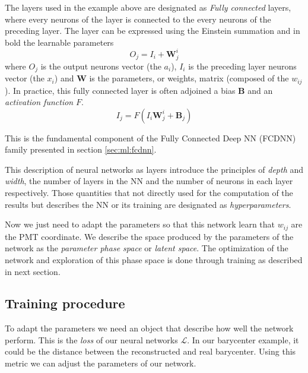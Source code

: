 \documentclass[../main.tex]{subfiles}
\begin{document}
The layers used in the example above are designated as \textit{Fully connected} layers, where every neurons of the layer is connected to the every neurons of the preceding layer. The layer can be expressed using the Einstein summation and in bold the learnable parameters
\begin{equation}
  \label{eq:ml:fully-connected-simple}
  O_{j} = I_{i} + \bm{W}_{j}^{i}
\end{equation}
where $O_{j}$ is the output neurons vector (the $a_i$), $I_{i}$ is the preceding layer neurons vector (the $x_i$) and $\bm{W}$ is the parameters, or weights, matrix (composed of the $w_{ij}$).
In practice, this fully connected layer is often adjoined a bias $\bm{B}$ and an \textit{activation function} $F$.
\begin{equation}
  \label{eq:ml:fully-connected}
  I_{j} = F(I_{i} \bm{W}_{j}^{i} + \bm{B}_j)
\end{equation}

This is the fundamental component of the Fully Connected Deep NN (FCDNN) family presented in section \ref{sec:ml:fcdnn}.

This description of neural networks as layers introduce the principles of \textit{depth} and \textit{width}, the number of layers in the NN and the number of neurons in each layer respectively. Those quantities that not directly used for the computation of the results but describes the NN or its training are designated as \textit{hyperparameters}.

Now we just need to adapt the parameters so that this network learn that $w_{ij}$ are the PMT coordinate. We describe the space produced by the parameters of the network as the \textit{parameter phase space} or \textit{latent space}. The optimization of the network and exploration of this phase space is done through training as described in next section.

\subsection{Training procedure}
\label{sec:ml:train}

To adapt the parameters we need an object that describe how well the network perform. This is the \textit{loss} of our neural networks $\mathcal{L}$. In our barycenter example, it could be the distance between the reconstructed and real barycenter. Using this metric we can adjust the parameters of our network.
\end{document}
